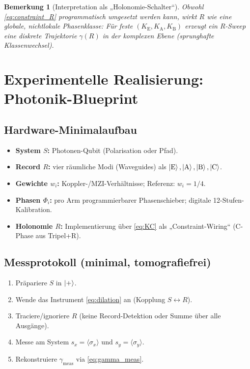 \documentclass[11pt,a4paper]{article}
\newtheorem{remark}{Bemerkung}
\newcommand{\EE}{\mathrm{E}}
\newcommand{\AA}{\mathrm{A}}
\newcommand{\BB}{\mathrm{B}}
\newcommand{\CC}{\mathrm{C}}
\begin{document}
	\begin{remark}[Interpretation als „Holonomie-Schalter“]
		Obwohl \eqref{eq:constraint_R} programmatisch umgesetzt werden kann, wirkt \(R\) wie eine globale,
		nichtlokale Phasenklasse: Für feste \((K_\EE,K_\AA,K_\BB)\) erzeugt ein \(R\)-Sweep eine diskrete Trajektorie
		\(\gamma(R)\) in der komplexen Ebene (sprunghafte Klassenwechsel).
	\end{remark}
	
	\section{Experimentelle Realisierung: Photonik-Blueprint}
	
	\subsection{Hardware-Minimalaufbau}
	
	\begin{itemize}
		\item \textbf{System \(S\):} Photonen-Qubit (Polarisation oder Pfad).
		\item \textbf{Record \(R\):} vier räumliche Modi (Waveguides) als \(\ket{\EE},\ket{\AA},\ket{\BB},\ket{\CC}\).
		\item \textbf{Gewichte \(w_i\):} Koppler-/MZI-Verhältnisse; Referenz: \(w_i=1/4\).
		\item \textbf{Phasen \(\Phi_i\):} pro Arm programmierbarer Phasenschieber; digitale 12-Stufen-Kalibration.
		\item \textbf{Holonomie \(R\):} Implementierung über \eqref{eq:KC} als „Constraint-Wiring“ (C-Phase aus
		Tripel+R).
	\end{itemize}
	
	\subsection{Messprotokoll (minimal, tomografiefrei)}
	
	\begin{enumerate}
		\item Präpariere \(S\) in \(\ket{+}\).
		\item Wende das Instrument \eqref{eq:dilation} an (Kopplung \(S\leftrightarrow R\)).
		\item Traciere/ignoriere \(R\) (keine Record-Detektion oder Summe über alle Ausgänge).
		\item Messe am System \(s_x=\langle\sigma_x\rangle\) und \(s_y=\langle\sigma_y\rangle\).
		\item Rekonstruiere \(\gamma_{\mathrm{meas}}\) via \eqref{eq:gamma_meas}.
	\end{enumerate}
	
\end{document}
